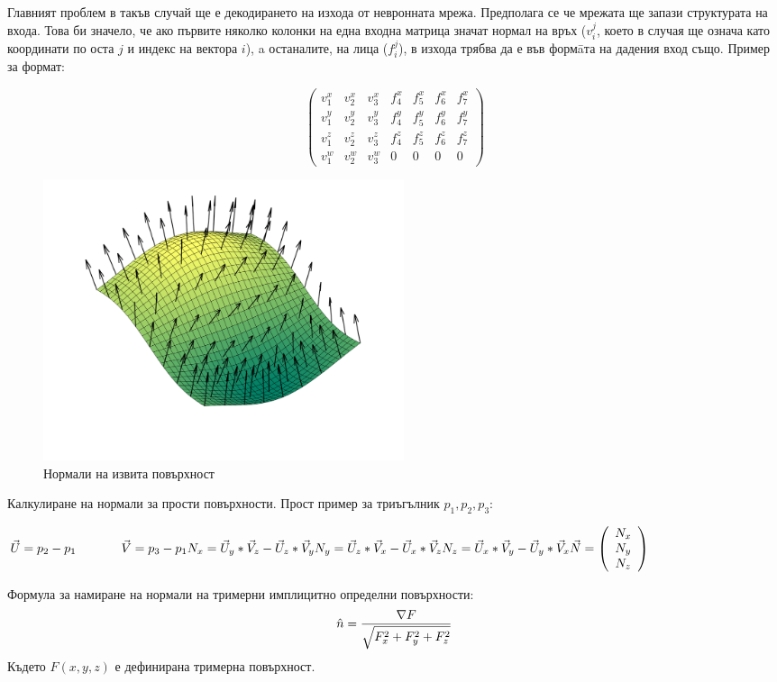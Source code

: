 Главният проблем в такъв случай ще е декодирането на изхода от невронната мрежа. Предполага се че мрежата ще запази структурата на входа. Това би значело, че ако първите няколко колонки на една входна матрица значат нормал на връх ($v^j_i$, което в случая ще означа като координати по оста $j$ и индекс на вектора $i$), a останалите, на лица ($f^j_i$), в изхода трябва да е във формāта на дадения вход също. Пример за формат:

\[ \left( \begin{array}{ccccccc}
v^x_1 & v^x_2 & v^x_3 & f^x_4 & f^x_5 & f^x_6 & f^x_7\\
v^y_1 & v^y_2 & v^y_3 & f^y_4 & f^y_5 & f^y_6 & f^y_7\\
v^z_1 & v^z_2 & v^z_3 & f^z_4 & f^z_5 & f^z_6 & f^z_7\\
v^w_1 & v^w_2 & v^w_3 & 0 & 0 & 0 & 0
\end{array} \right)
\]
\begin{center}
\begin{figure}[h]
    \centering
    \includegraphics[width=300pt]{normals.png}
    \caption{Нормали на извита повърхност}
    \label{fig:mesh1}
\end{figure}
\end{center}
Калкулиране на нормали за прости повърхности. Прост пример за триъгълник $p_1, p_2, p_3$:

\begin{center}
$\vec{U} = p_2 - p_1 \hspace{0.5in} \vec{V} = p_3 - p_1\\
N_x = \vec{U}_y*\vec{V}_z - \vec{U}_z*\vec{V}_y\\
N_y = \vec{U}_z*\vec{V}_x - \vec{U}_x*\vec{V}_z\\
N_z = \vec{U}_x*\vec{V}_y - \vec{U}_y*\vec{V}_x\\
\vec{N} = \left( \begin{array}{c}
N_x\\
N_y\\
N_z
\end{array} \right)
$
\end{center}
Формула за намиране на нормали на тримерни имплицитно определни повърхности:
\[\Large \hat{n} = \frac{\nabla F}{\sqrt{F^2_x + F^2_y + F^2_z}}\]
Където $F(x,y,z)$ е дефинирана тримерна повърхност.

